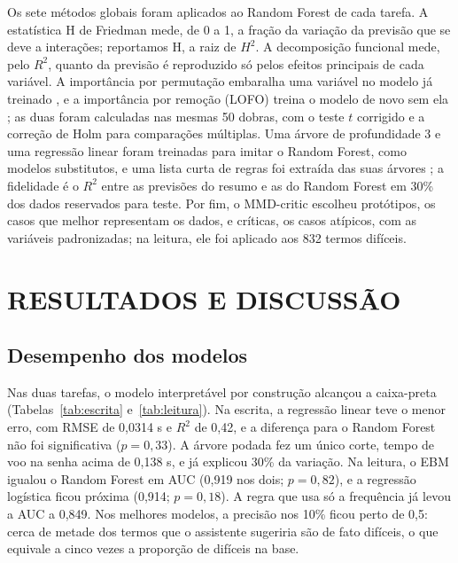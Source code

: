 \documentclass[12pt,a4paper]{article}
\newcommand{\Rdois}{$R^2$}
\begin{document}
Os sete métodos globais foram aplicados ao Random Forest de cada tarefa. A estatística H de Friedman \citep{friedman2008} mede, de 0 a 1, a
fração da variação da previsão que se deve a interações; reportamos H, a raiz
de $H^2$. A decomposição funcional \citep{molnar2022} mede, pelo \Rdois, quanto
da previsão é reproduzido só pelos efeitos principais de cada variável. A
importância por permutação embaralha uma variável no modelo já treinado
\citep{breiman2001}, e a importância por remoção (LOFO) treina o modelo de novo
sem ela \citep{lei2018}; as duas foram calculadas nas mesmas 50 dobras, com o
teste $t$ corrigido e a correção de Holm para comparações
múltiplas. Uma árvore de profundidade 3 e uma regressão linear foram treinadas
para imitar o Random Forest, como modelos substitutos, e uma lista curta de
regras foi extraída das suas árvores \citep{friedman2008}; a fidelidade é o
\Rdois{} entre as previsões do resumo e as do Random Forest em 30\% dos dados
reservados para teste. Por fim, o MMD-critic \citep{kim2016} escolheu
protótipos, os casos que melhor representam os dados, e críticas, os casos
atípicos, com as variáveis padronizadas; na leitura, ele foi aplicado aos 832
termos difíceis.

\section{RESULTADOS E DISCUSSÃO}

\subsection{Desempenho dos modelos}

Nas duas tarefas, o modelo interpretável por construção alcançou a caixa-preta
(Tabelas~\ref{tab:escrita} e~\ref{tab:leitura}). Na escrita, a regressão linear
teve o menor erro, com RMSE de 0,0314 s e \Rdois{} de 0,42, e a diferença para
o Random Forest não foi significativa ($p = 0,33$). A árvore podada fez um único
corte, tempo de voo na senha acima de 0,138 s, e já explicou 30\% da variação.
Na leitura, o EBM igualou o Random Forest em AUC (0,919 nos dois; $p = 0,82$), e
a regressão logística ficou próxima (0,914; $p = 0,18$). A regra que usa só a
frequência já levou a AUC a 0,849. Nos melhores modelos, a precisão nos 10\%
ficou perto de 0,5: cerca de metade dos termos que o assistente sugeriria são
de fato difíceis, o que equivale a cinco vezes a proporção de difíceis na base.
\end{document}
